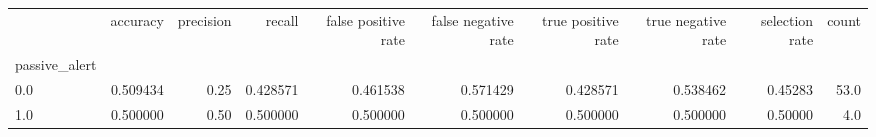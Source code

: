 \begin{tabular}{lrrrrrrrrr}
\toprule
{} &  accuracy &  precision &    recall &  false positive rate &  false negative rate &  true positive rate &  true negative rate &  selection rate &  count \\
passive\_alert &           &            &           &                      &                      &                     &                     &                 &        \\
\midrule
0.0           &  0.509434 &       0.25 &  0.428571 &             0.461538 &             0.571429 &            0.428571 &            0.538462 &         0.45283 &   53.0 \\
1.0           &  0.500000 &       0.50 &  0.500000 &             0.500000 &             0.500000 &            0.500000 &            0.500000 &         0.50000 &    4.0 \\
\bottomrule
\end{tabular}
